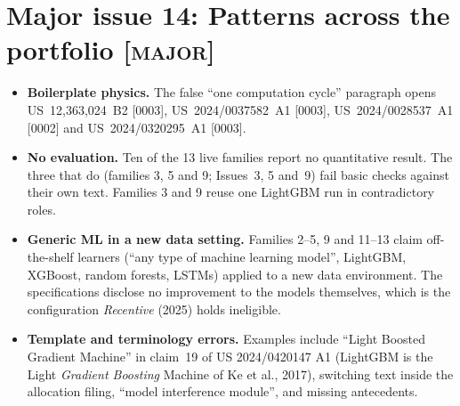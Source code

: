 \documentclass[10pt,a4paper]{article}
\newcommand{\sev}[1]{\textsc{\color{BrickRed}[#1]}}
\begin{document}
\section{Major issue 14: Patterns across the portfolio \sev{major}}\label{sec:patterns}
\begin{itemize}
  \item \textbf{Boilerplate physics.} The false ``one computation cycle'' paragraph opens US~12,363,024~B2 [0003], US~2024/0037582~A1 [0003], US~2024/0028537~A1 [0002] and US~2024/0320295~A1 [0003].
  \item \textbf{No evaluation.} Ten of the 13 live families report no quantitative result. The three that do (families 3, 5 and 9; Issues~3, 5 and~9) fail basic checks against their own text. Families 3 and 9 reuse one LightGBM run in contradictory roles.
  \item \textbf{Generic ML in a new data setting.} Families 2--5, 9 and 11--13 claim off-the-shelf learners (``any type of machine learning model'', LightGBM, XGBoost, random forests, LSTMs) applied to a new data environment. The specifications disclose no improvement to the models themselves, which is the configuration \emph{Recentive} (2025) holds ineligible.
  \item \textbf{Template and terminology errors.} Examples include ``Light Boosted Gradient Machine'' in claim~19 of US 2024/0420147 A1 (LightGBM is the Light \emph{Gradient Boosting} Machine of Ke et al., 2017), switching text inside the allocation filing, ``model interference module'', and missing antecedents.
\end{itemize}

\end{document}
